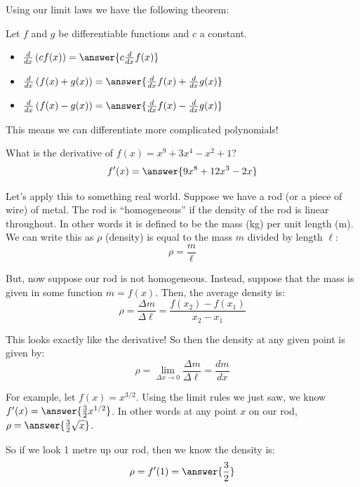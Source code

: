 \documentclass{ximera}
\begin{document}
Using our limit laws we have the following theorem:

\begin{theorem}\label{theorem:5-3}
Let $f$ and $g$ be differentiable functions and $c$ a constant.
\begin{itemize}
  \item $\frac{d}{dx}\left(c f(x)\right)=\answer{c \frac{d}{dx} f(x)}$
  \item $\frac{d}{dx}\left(f(x)+g(x)\right)=\answer{\frac{d}{dx} f(x)+\frac{d}{dx} g(x)}$
  \item $\frac{d}{dx}\left(f(x)-g(x)\right)=\answer{\frac{d}{dx} f(x)-\frac{d}{dx} g(x)}$
\end{itemize}
\end{theorem}

This means we can differentiate more complicated polynomials!

\begin{example}\label{example:5-4}
What is the derivative of $f(x)=x^{9}+3 x^{4}-x^{2}+1$?
\[
f'(x)=\answer{9 x^{8}+12 x^{3}-2 x}
\]
\end{example}

\begin{example}\label{example:5-5}
Let's apply this to something real world. Suppose we have a rod (or a piece of wire) of metal. The rod is ``homogeneous'' if the density of the rod is linear throughout. In other words it is defined to be the mass (kg) per unit length (m). We can write this as $\rho$ (density) is equal to the mass $m$ divided by length $\ell$:
\[
\rho=\frac{m}{\ell}
\]

But, now suppose our rod is not homogeneous. Instead, suppose that the mass is given in some function $m=f(x)$. Then, the average density is:
\[
\rho=\frac{\Delta m}{\Delta \ell}=\frac{f\left(x_{2}\right)-f\left(x_{1}\right)}{x_{2}-x_{1}}
\]

This looks exactly like the derivative! So then the density at any given point is given by:
\[
\rho=\lim _{\Delta x \rightarrow 0} \frac{\Delta m}{\Delta \ell}=\frac{d m}{d x}
\]

For example, let $f(x)=x^{3 / 2}$. Using the limit rules we just saw, we know $f^{\prime}(x)=\answer{\frac{3}{2} x^{1/2}}$. In other words at any point $x$ on our rod, $\rho=\answer{\frac{3}{2}\sqrt{x}}$.

So if we look 1 metre up our rod, then we know the density is:
\[
\rho = f'(1) = \answer{\frac{3}{2}}
\]
\end{example}
\end{document}
